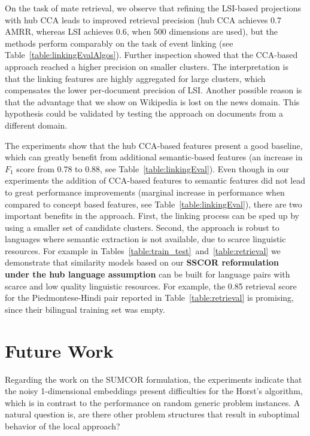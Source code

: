 On the task of mate retrieval, we observe that refining the LSI-based
projections with hub CCA leads to improved retrieval precision (hub CCA
achieves 0.7 AMRR, whereas LSI achieves 0.6, when 500 dimensions are used), but the
methods perform comparably on the task of event linking (see Table~\ref{table:linkingEvalAlgos}).
Further inspection showed that the CCA-based approach reached a higher precision on smaller
clusters. The interpretation is that the linking features are highly
aggregated for large clusters, which compensates the lower per-document
precision of LSI. Another possible reason is that the advantage that we
show on Wikipedia is lost on the news domain. This hypothesis could be
validated by testing the approach on documents from a different domain.

The experiments show that the hub CCA-based features present a good baseline,
which can greatly benefit from additional semantic-based features (an increase
in $F_1$ score from 0.78 to 0.88, see Table~\ref{table:linkingEval}).
Even though in our experiments the addition of CCA-based features to semantic features did not
lead to great performance improvements (marginal increase in performance when compared
to concept based features, see Table~\ref{table:linkingEval}), there are two important benefits in the
approach. First, the linking process can be sped up by using a smaller set of
candidate clusters. Second, the approach is robust to languages where semantic
extraction is not available, due to scarce linguistic resources.
For example in Tables~\ref{table:train_test}~and~\ref{table:retrieval} we demonstrate
that similarity models based on our \textbf{SSCOR reformulation under the hub language
assumption} can be built for language pairs with scarce and
low quality linguistic resources. For example, the 0.85 retrieval score
for the Piedmontese-Hindi pair reported in Table~\ref{table:retrieval} is
promising, since their bilingual training set was empty.

\section{Future Work}

Regarding the work on the SUMCOR formulation, the experiments indicate
that the noisy 1-dimensional embeddings present difficulties for the Horst's
algorithm, which is in contrast to the performance on random generic problem instances. A natural
question is, are there other problem structures that result in suboptimal behavior of the local approach?

